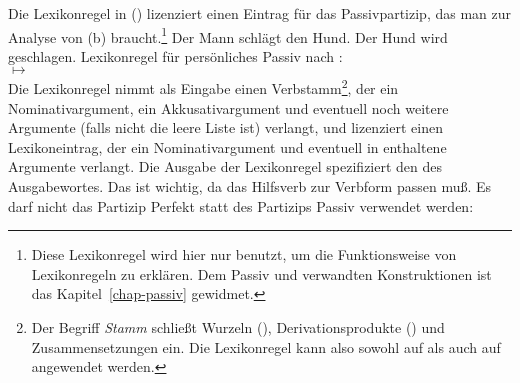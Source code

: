 Die Lexikonregel in () lizenziert einen Eintrag für das Passivpartizip,
das man zur Analyse von (b) braucht.\footnote{
  Diese Lexikonregel wird hier nur benutzt, um die Funktionsweise von Lexikonregeln zu erklären.
  Dem Passiv und verwandten Konstruktionen ist das Kapitel~\ref{chap-passiv} gewidmet.%
}
\eal
\ex Der Mann schlägt den Hund.
\ex Der Hund wird geschlagen.
\zl
\ea
\label{pass-lr-mlr}
Lexikonregel für persönliches Passiv nach \citet{Kiss92}:\\
 $\mapsto$ \\
\z
Die Lexikonregel nimmt als Eingabe einen Verbstamm\footnote{
  Der Begriff \emph{Stamm} schließt Wurzeln (),
  Derivationsprodukte () und Zusammensetzungen ein. 
  Die Lexikonregel kann also sowohl auf  als auch auf 
  angewendet werden.%
}, der ein Nominativargument, ein Akkusativargument und eventuell noch weitere Argumente (falls 
nicht die leere Liste ist) verlangt, und lizenziert einen Lexikoneintrag, der ein Nominativargument 
und eventuell in  enthaltene Argumente verlangt. Die Ausgabe der Lexikonregel spezifiziert
den \vformw des Ausgabewortes. Das ist wichtig, da das Hilfsverb zur Verbform passen muß. Es darf \zb
nicht das Partizip Perfekt statt des Partizips Passiv verwendet werden:
\eal
{}
\zl

